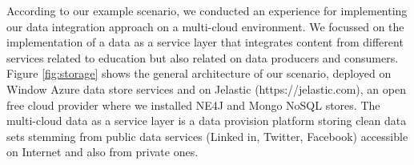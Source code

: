 \begin{figure}
\end{figure}

According to our example scenario, we conducted an experience for implementing our data integration approach on a multi-cloud environment. We focussed on the implementation of a data as a service layer that integrates content from different services related to education but also related on data producers and consumers. Figure \ref{fig:storage} shows the general architecture of our scenario, deployed on Window Azure data store services and on Jelastic (https://jelastic.com), an open free cloud provider where we installed NE4J and Mongo NoSQL stores. The multi-cloud data as a service layer is a data provision platform storing clean data sets stemming from public data services (Linked in, Twitter, Facebook) accessible on Internet and also from private ones. 

